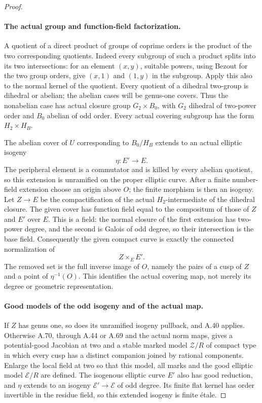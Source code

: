 \begin{proof}
\paragraph{The actual group and function-field factorization.}
A quotient of a direct product of groups of coprime orders is
the product of the two corresponding quotients. Indeed every
subgroup of such a product splits into its two intersections:
for an element \((x,y)\), suitable powers, using Bezout for the
two group orders, give \((x,1)\) and \((1,y)\) in the subgroup.
Apply this also to the normal kernel of the quotient. Every
quotient of a dihedral two-group is dihedral or abelian; the
abelian cases will be genus-one covers. Thus the nonabelian
case has actual closure group \(G_2\times B_0\), with \(G_2\)
dihedral of two-power order and \(B_0\) abelian of odd order.
Every actual covering subgroup has the form \(H_2\times H_B\).

The abelian cover of \(U\) corresponding to \(B_0/H_B\)
extends to an actual elliptic isogeny
\[
                         \eta:E'\longrightarrow E.
\]
The peripheral element is a commutator and is killed by every
abelian quotient, so this extension is unramified on the proper
elliptic curve. After a finite number-field extension choose an
origin above \(O\); the finite morphism is then an isogeny.
Let \(Z\to E\) be the compactification of the actual
\(H_2\)-intermediate of the dihedral closure. The given cover
has function field equal to the compositum of those of \(Z\)
and \(E'\) over \(E\). This is a field: the normal closure
of the first extension has two-power degree, and the second is
Galois of odd degree, so their intersection is the base field.
Consequently the given compact curve is exactly the connected
normalization of
\[
                         Z\times_E E'.
\]
The removed set is the full inverse image of \(O\), namely the
pairs of a cusp of \(Z\) and a point of \(\eta^{-1}(O)\).
This identifies the actual covering map, not merely its degree
or geometric representation.

\paragraph{Good models of the odd isogeny and of the actual map.}
If \(Z\) has genus one, so does its unramified isogeny pullback,
and A.40 applies. Otherwise A.70, through A.44 or A.69 and the
actual norm maps, gives a potential-good Jacobian at two and a
stable marked model \(\mathcal Z/R\) of compact type in which
every cusp has a distinct companion joined by rational
components. Enlarge the local field at two so that this model,
all marks and the good elliptic model \(\mathcal E/R\) are
defined. The isogenous elliptic curve \(E'\) also has good
reduction, and \(\eta\) extends to an isogeny
\(\mathcal E'\to\mathcal E\) of odd degree. Its finite flat
kernel has order invertible in the residue field, so this
extended isogeny is finite \'{e}tale.


\end{proof}
